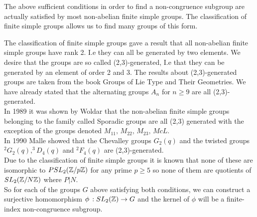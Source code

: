 The above sufficient conditions in order to find a non-congruence subgroup are actually satisfied by most non-abelian finite simple groups. The classification of finite simple groups allows us to find many groups of this form.

\begin{remark}
The classification of finite simple groups gave a result that all non-abelian finite simple groups have rank 2. I.e they can all be generated by two elements. We desire that the groups are so called (2,3)-generated, I.e that they can be generated by an element of order 2 and 3. The results about (2,3)-generated groups are taken from the book Groups of Lie Type and Their Geometries\citep{kantorGenerated}.
We have already stated that the alternating groups $A_n$ for $n \geq 9$ are all (2,3)-generated.\\
In 1989 it was shown by Woldar that the non-abelian finite simple groups belonging to the family called Sporadic groups are all (2,3) generated with the exception of the groups denoted $M_{11},\, M_{22},\, M_{23},\, McL$. \\
In 1990 Malle showed that the Chevalley groups $G_2(q)$ and the twisted groups $^2G_2(q), ^3D_4(q)$ and $^2F_4(q)$ are (2,3)-generated.\\

Due to the classification of finite simple groups it is known that none of these are isomorphic to $\psltznz[p]$ for any prime $p \geq 5$ so none of them are quotients of $\sltznz$ where $ P \vert N$. \\
So for each of the groups $G$ above satisfying both conditions, we can construct a surjective homomorphism $\phi \, : \sltz \rightarrow G$ and the kernel of $\phi$ will be a finite-index non-congruence subgroup.

\end{remark}

